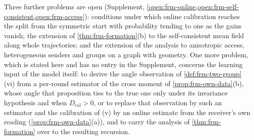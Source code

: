 Three further problems are open (Supplement, \cref{open:frm-online,open:frm-self-consistent,open:frm-access}): conditions under which online calibration reaches the split from the symmetric start with probability tending to one as the gains vanish; the extension of \cref{thm:frm-formation}(b) to the self-consistent mean field along whole trajectories; and the extension of the analysis to anisotropic access, heterogeneous senders and groups on a graph with geometry. One more problem, which is stated here and has no entry in the Supplement, concerns the learning input of the model itself: to derive the angle observation of \cref{def:frm-two-group}(vi) from a per-round estimator of the cross moment of \cref{prop:frm-own-data}(b), whose angle that proposition ties to the true one only under its invariance hypothesis and when $D_{\mathrm{cal}}>0$, or to replace that observation by such an estimator and the calibration of (v) by an online estimate from the receiver's own reading (\cref{prop:frm-own-data}(a)), and to carry the analysis of \cref{thm:frm-formation} over to the resulting recursion.
